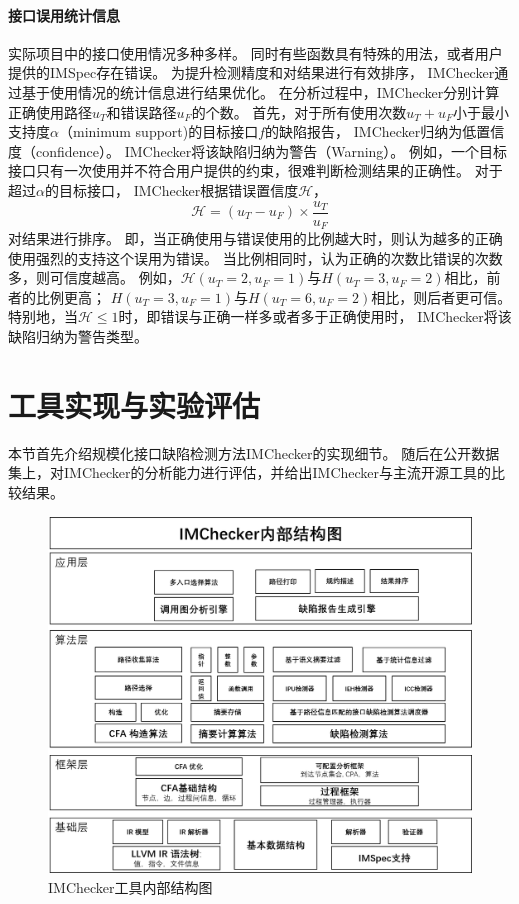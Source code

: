 \paragraph{接口误用统计信息}
实际项目中的接口使用情况多种多样。
同时有些函数具有特殊的用法，或者用户提供的IMSpec存在错误。
为提升检测精度和对结果进行有效排序，
IMChecker通过基于使用情况的统计信息进行结果优化。
在分析过程中，IMChecker分别计算正确使用路径$u_T$和错误路径$u_F$的个数。
首先，对于所有使用次数$u_T+u_F$小于最小支持度$\alpha$（minimum support)的目标接口$f$的缺陷报告，
IMChecker归纳为低置信度（confidence）。
IMChecker将该缺陷归纳为警告（Warning）。
例如，一个目标接口只有一次使用并不符合用户提供的约束，很难判断检测结果的正确性。
对于超过$\alpha$的目标接口，
IMChecker根据错误置信度$\mathcal{H}$，
$$\mathcal{H}  = ({u_T-u_F})\times\dfrac{u_T}{u_F}$$
对结果进行排序。
即，当正确使用与错误使用的比例越大时，则认为越多的正确使用强烈的支持这个误用为错误。
当比例相同时，认为正确的次数比错误的次数多，则可信度越高。
例如，$\mathcal{H}(u_T=2, u_F=1)$与$H(u_T=3, u_F=2)$相比，前者的比例更高；
$H(u_T=3, u_F=1)$与$H(u_T=6, u_F=2)$相比，则后者更可信。
特别地，当$\mathcal{H} \le 1$时，即错误与正确一样多或者多于正确使用时，
IMChecker将该缺陷归纳为警告类型。

\section{工具实现与实验评估}
\label{sec:3.4}
本节首先介绍规模化接口缺陷检测方法IMChecker的实现细节。
随后在公开数据集上，对IMChecker的分析能力进行评估，并给出IMChecker与主流开源工具的比较结果。

\begin{figure}[t]
	\centering
	\includegraphics[width=0.9\linewidth]{figures/cp3-implementation.png}
	\caption{
		IMChecker工具内部结构图
	}
	\label{fig:3-4-implementation}
\end{figure}

